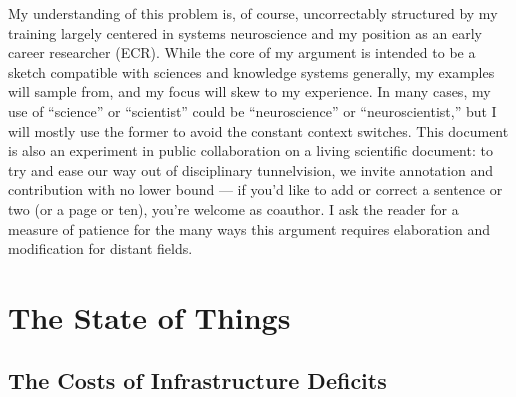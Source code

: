 \documentclass[10pt]{article}
\begin{document}
\begin{multicols}{2}
My understanding of this problem is, of course, uncorrectably structured
by my training largely centered in systems neuroscience and my position
as an early career researcher (ECR). While the core of my argument is
intended to be a sketch compatible with sciences and knowledge systems
generally, my examples will sample from, and my focus will skew to my
experience. In many cases, my use of ``science'' or ``scientist'' could
be ``neuroscience'' or ``neuroscientist,'' but I will mostly use the
former to avoid the constant context switches. This document is also an
experiment in public collaboration on a living scientific document: to
try and ease our way out of disciplinary tunnelvision, we invite
annotation and contribution with no lower bound --- if you'd like to add
or correct a sentence or two (or a page or ten), you're welcome as
coauthor. I ask the reader for a measure of patience for the many ways
this argument requires elaboration and modification for distant fields.

\end{multicols}


\hypertarget{the-state-of-things}{%
\section{The State of Things}\label{the-state-of-things}}

\hypertarget{the-costs-of-infrastructure-deficits}{%
\subsection{The Costs of Infrastructure
Deficits}\label{the-costs-of-infrastructure-deficits}}
\end{document}
